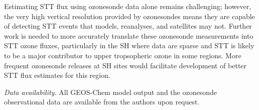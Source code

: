 \documentclass[acp, manuscript]{copernicus} %
\begin{document}
Estimating STT flux using ozonesonde data alone remains challenging; however, the very high vertical resolution provided by ozonesondes means they are capable of detecting STT events that models, reanalyses, and satellites may not. 
Further work is needed to more accurately translate these ozonesonde measurements into STT ozone fluxes, particularly in the SH where data are sparse and STT is likely to be a major contributor to upper tropsopheric ozone in some regions.
More frequent ozonesonde releases at SH sites would facilitate development of better STT flux estimates for this region.

\appendix

\appendixfigures  %
\appendixtables   %




%
\textit{Data availability.} All GEOS-Chem model output and the ozonesonde observational data are available from the authors upon request.
\end{document}
